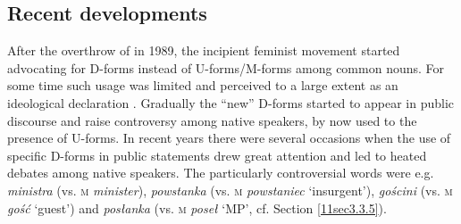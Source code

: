 \documentclass[output=paper,colorlinks,citecolor=brown]{langscibook}
\begin{document}
\subsection{Recent developments} \label{11sec4.4}

{\sloppy After the overthrow of  in 1989, the incipient feminist movement started advocating for D-forms instead of U-forms/M-forms among common nouns. For some time such usage was limited and perceived to a large extent as an ideological declaration \citep[278]{lazinski2006}. Gradually the ``new'' D-forms started to appear in public discourse and raise controversy among native speakers, by now used to the presence of U-forms. In recent years there were several occasions when the use of specific D-forms in public statements drew great attention and led to heated debates among native speakers. The particularly controversial words were e.g. \emph{ministra} (vs. \textsc{m} \emph{minister}), \emph{powstanka} (vs. \textsc{m} \emph{powstaniec} `insurgent'), \emph{gościni} (vs. \textsc{m} \emph{gość} `guest') and \emph{posłanka} (vs. \textsc{m} \emph{poseł} `MP', cf. Section \ref{11sec3.3.5}).\par}
\end{document}
